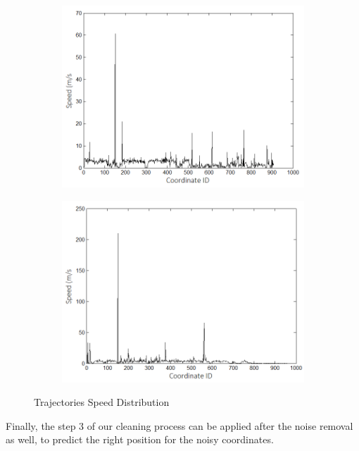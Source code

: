 \documentclass[a4paper,12pt]{article}
\begin{document}
\begin{figure}[!h]
\centering
\begin{subfigure}{0.49\textwidth}
 \centering
 \label{fig7a}
 \includegraphics[scale=0.45]{speed1}
 \caption{}
\end{subfigure}
\hfill 
\begin{subfigure}{0.49\textwidth}
 \centering
 \label{fig7b}
 \includegraphics[scale=0.45]{speed2}
 \caption{}
\end{subfigure}
\caption{Trajectories Speed Distribution}
\label{fig:fig7}
\end{figure}

Finally, the step 3 of our cleaning process can be applied after the noise removal as well, to predict the right position for the noisy coordinates.
\end{document}

